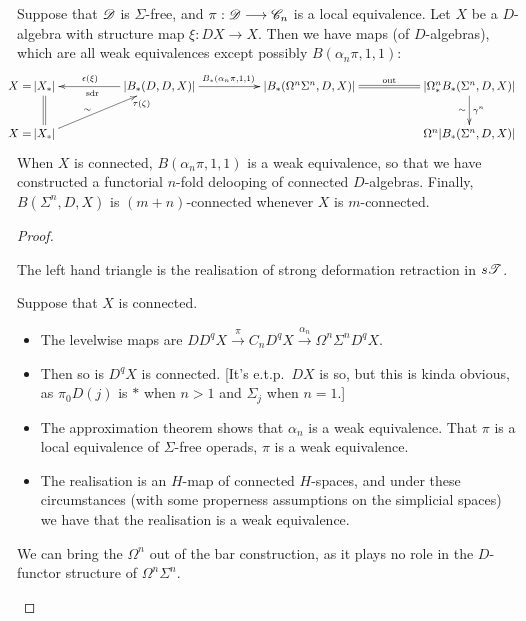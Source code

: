 \documentclass[11pt]{article}
\begin{document}
\begin{Operads}
\begin{itemise}
\end{itemise}


\begin{thm*}[13.1]
Suppose that $\mathscr{D}$ is $\Sigma$-free, and $\pi:\mathscr{D}\longrightarrow\mathscr{C}_n$ is a local equivalence. Let $X$ be a $D$-algebra with structure map $\xi:DX\to X$. Then we have maps (of $D$-algebras), which are all weak equivalences except possibly $B(\alpha_n\pi,1,1)$:
\[\quad \xymatrix@C=1.8cm{
\makebox[0cm][r]{$X=$\,}\ar@{=}[d]{|X_*|}&\ar[l]_{\epsilon(\xi)\qquad}^{\textup{sdr\qquad}}
{|B_*(D,D,X)|}\ar[r]^{B_*(\alpha_n\pi,1,1)\quad }
&{|B_*(\Omega^n\Sigma^n,D,X)|}\ar@{=}[r]^{\textup{out}}&{|\Omega^n_*B_*(\Sigma^n,D,X)|}\ar[d]^{\gamma^n}_\sim\\
\makebox[0cm][r]{$X=$\,}{|X_*|}\ar[ur]_(.8){\tau(\zeta)}^(.4)\sim&
&&\Omega^n{|B_*(\Sigma^n,D,X)|}
}\]
When $X$ is connected, $B(\alpha_n\pi,1,1)$ is a weak equivalence, so that we have constructed a functorial $n$-fold delooping of connected $D$-algebras. Finally, $B(\Sigma^n,D,X)$ is $(m+n)$-connected whenever $X$ is $m$-connected.
\end{thm*}
\begin{proof}
\begin{itemise}
\item The left hand triangle is the realisation of strong deformation retraction in $s\mathscr{T}$.
\item Suppose that $X$ is connected.
\begin{itemize}\squishlist
\item The levelwise maps are $DD^{q}X\overset{\pi}{\to} C_nD^{q}X\overset{\alpha_n}{\to} \Omega^n\Sigma^nD^qX$.
\item Then so is $D^qX$ is connected. [It's e.t.p.\ $DX$ is so, but this is kinda obvious, as $\pi_0D(j)$ is $*$ when $n>1$ and $\Sigma_j$ when $n=1$.]
\item The approximation theorem shows that $\alpha_n$ is a weak equivalence. That $\pi$ is a local equivalence of $\Sigma$-free operads, $\pi$ is a weak equivalence.
\item The realisation is an $H$-map of connected $H$-spaces, and under these circumstances (with some properness assumptions on the simplicial spaces) we have that the realisation is a weak equivalence.
\end{itemize}
\item We can bring the $\Omega^n$ out of the bar construction, as it plays no role in the $D$-functor structure of $\Omega^n\Sigma^n$.

\end{itemise}
\end{proof}
\end{Operads}
\end{document}
